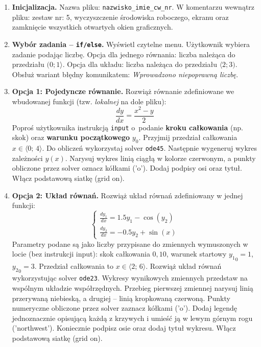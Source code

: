 \documentclass[a4paper,11pt]{article}
\begin{document}
\begin{enumerate}[leftmargin=*, label=\textbf{\arabic*.}, itemsep=2pt]

  \item \textbf{Inicjalizacja.}
    Nazwa pliku: \texttt{nazwisko\_imie\_cw\_nr}. W komentarzu wewnątrz pliku: zestaw nr: 5, wyczyszczenie środowiska roboczego, ekranu oraz zamknięcie wszystkich otwartych okien graficznych.

  \item \textbf{Wybór zadania -- \texttt{if/else}.}
    Wyświetl czytelne menu. Użytkownik wybiera zadanie podając liczbę. Opcja dla jednego równania: liczba należąca do przedziału $(0; 1\rangle$. Opcja dla układu: liczba należąca do przedziału $\langle 2; 3)$. Obsłuż wariant błędny komunikatem: \textit{Wprowadzono niepoprawną liczbę}.

  \item \textbf{Opcja 1: Pojedyncze równanie.}
    Rozwiąż równanie zdefiniowane we wbudowanej funkcji (tzw. \textit{lokalnej} na dole pliku):
    \[ \frac{dy}{dx} = \frac{x^2 - y}{2} \]
    Poproś użytkownika instrukcją \texttt{input} o~podanie \textbf{kroku całkowania} (np. skok) oraz \textbf{warunku początkowego} $y_0$. Przyjmij przedział całkowania $x \in \langle 0;\,4 \rangle$.
    Do obliczeń wykorzystaj solver \texttt{ode45}. Następnie wygeneruj wykres zależności $y(x)$. Narysuj wykres linią ciągłą w kolorze czerwonym, a punkty obliczone przez solver oznacz kółkami ('o'). Dodaj podpisy osi oraz tytuł. Włącz podstawową siatkę (grid on).

  \item \textbf{Opcja 2: Układ równań.}
    Rozwiąż układ równań zdefiniowany w jednej funkcji:\\[-0.5em]
    \[
    \begin{cases}
      \frac{dy_1}{dx} = 1.5y_1 - \cos(y_2) \\
      \frac{dy_2}{dx} = -0.5y_2 + \sin(x)
    \end{cases}
    \]
    Parametry podane są jako liczby przypisane do zmiennych wymuszonych w locie (bez instrukcji input): skok całkowania $0{,}10$, warunek startowy $ {y_1}_{0} = 1 $, $ {y_2}_{0} = 3 $. Przedział całkowania to $x \in \langle 2;\,6 \rangle$.
    Rozwiąż układ równań wykorzystując solver \texttt{ode23}. Wykresy wynikowych zmiennych przedstaw na wspólnym układzie współrzędnych. Przebieg pierwszej zmiennej narysuj linią przerywaną niebieską, a drugiej -- linią kropkowaną czerwoną. Punkty numeryczne obliczone przez solver zaznacz kółkami ('o'). Dodaj legendę jednoznacznie opisującą każdą z krzywych i umieść ją w lewym górnym rogu ('northwest'). Koniecznie podpisz osie oraz dodaj tytuł wykresu. Włącz podstawową siatkę (grid on).

\end{enumerate}
\end{document}
